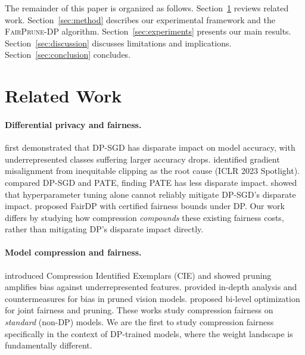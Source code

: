 \documentclass{article}
\newcommand{\FairPrunDP}{\textsc{FairPrune-DP}}
\begin{document}
The remainder of this paper is organized as follows. Section~\ref{sec:related} reviews related work. Section~\ref{sec:method} describes our experimental framework and the \FairPrunDP{} algorithm. Section~\ref{sec:experiments} presents our main results. Section~\ref{sec:discussion} discusses limitations and implications. Section~\ref{sec:conclusion} concludes.

\section{Related Work}
\label{sec:related}

\paragraph{Differential privacy and fairness.}
\citet{bagdasaryan2019differential} first demonstrated that DP-SGD has disparate impact on model accuracy, with underrepresented classes suffering larger accuracy drops. \citet{esipova2023disparate} identified gradient misalignment from inequitable clipping as the root cause (ICLR 2023 Spotlight). \citet{uniyal2021dpsgd} compared DP-SGD and PATE, finding PATE has less disparate impact. \citet{demelius2025private} showed that hyperparameter tuning alone cannot reliably mitigate DP-SGD's disparate impact. \citet{tran2023fairdp} proposed FairDP with certified fairness bounds under DP. Our work differs by studying how compression \emph{compounds} these existing fairness costs, rather than mitigating DP's disparate impact directly.

\paragraph{Model compression and fairness.}
\citet{hooker2020characterising} introduced Compression Identified Exemplars (CIE) and showed pruning amplifies bias against underrepresented features. \citet{iofinova2023bias} provided in-depth analysis and countermeasures for bias in pruned vision models. \citet{dai2023integrating} proposed bi-level optimization for joint fairness and pruning. These works study compression fairness on \emph{standard} (non-DP) models. We are the first to study compression fairness specifically in the context of DP-trained models, where the weight landscape is fundamentally different.
\end{document}
